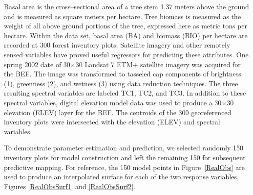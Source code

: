 \documentclass[a4paper]{article}
\begin{document}
Basal area is the cross--sectional area of a tree stem 1.37 meters above the ground and is measured as square meters per hectare.  Tree biomass is measured as the weight of all above ground portions of the tree, expressed here as metric tons per hectare.  Within the data set, basal area (BA) and biomass (BIO) per hectare are recorded at 300 forest inventory plots.  Satellite imagery and other remotely sensed variables have proved useful regressors for predicting these attributes.  One spring 2002 date of 30$\times$30 Landsat 7 ETM+ satellite imagery was acquired for the BEF.  The image was transformed to tasseled cap components of brightness (1), greenness (2), and wetness (3) using data reduction techniques.  The three resulting spectral variables are labeled TC1, TC2, and TC3.  In addition to these spectral variables, digital elevation model data was used to produce a 30$\times$30 elevation (ELEV)  layer for the BEF.  The centroids of the 300 georeferenced inventory plots were intersected with the elevation (ELEV) and spectral variables.

To demonstrate parameter estimation and prediction, we selected randomly 150 inventory plots for model construction and left the remaining 150 for subsequent predictive mapping.  For reference, the 150 model points in Figure~\ref{RealObs} are used to produce an interpolated surface for each of the two response variables, Figures \ref{RealObsSurf1} and \ref{RealObsSurf2}.
\end{document}
